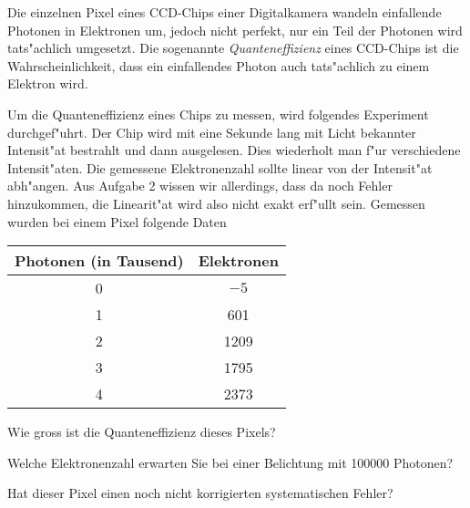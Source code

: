 Die einzelnen Pixel eines CCD-Chips einer Digitalkamera wandeln einfallende
Photonen in Elektronen um, jedoch nicht perfekt, nur ein Teil der Photonen
wird tats"achlich umgesetzt. Die sogenannte {\it Quanteneffizienz} eines
CCD-Chips ist die Wahrscheinlichkeit, dass ein einfallendes Photon
auch tats"achlich zu einem Elektron wird.

Um die Quanteneffizienz eines Chips zu messen, wird folgendes Experiment
durchgef"uhrt. Der Chip wird mit eine Sekunde lang mit Licht bekannter
Intensit"at bestrahlt und dann ausgelesen. Dies wiederholt man f"ur
verschiedene Intensit"aten. Die gemessene Elektronenzahl sollte
linear von der Intensit"at abh"angen. Aus Aufgabe 2 wissen wir allerdings,
dass da noch Fehler hinzukommen, die Linearit"at wird also nicht
exakt erf"ullt sein. Gemessen wurden bei einem Pixel folgende Daten
\begin{center}
\begin{tabular}{|c|c|}
\hline
Photonen (in Tausend)&Elektronen\\
\hline
0&$-5$\\
1&601\\
2&1209\\
3&1795\\
4&2373\\
\hline
\end{tabular}
\end{center}
\begin{teilaufgaben}
\item
Wie gross ist die Quanteneffizienz dieses Pixels?
\item
Welche Elektronenzahl erwarten Sie bei einer Belichtung mit
100000 Photonen?
\item
Hat dieser Pixel einen noch nicht korrigierten systematischen Fehler?
\end{teilaufgaben}


